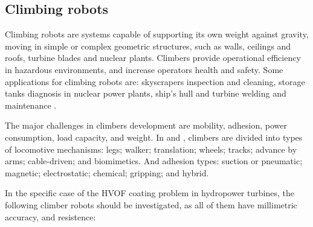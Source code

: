 \subsection{Climbing robots}\label{sota_climbers}
Climbing robots are systems capable of supporting its own weight against
gravity, moving in simple or complex geometric structures, such as
walls, ceilings and roofs, turbine blades and nuclear plants.
Climbers provide operational efficiency in hazardous environments, and increase
operators health and safety. Some applications for climbing robots are:
skyscrapers inspection and cleaning, storage tanks diagnosis in nuclear
power plants, ship's hull and turbine welding and
maintenance \citep{armada2003application}.

The major challenges in climbers development are mobility, adhesion,
power consumption, load capacity, and weight. In \cite{modular} and \cite{climbsurv},
climbers are divided into types of locomotive mechanisms: legs; walker; translation; wheels; tracks;
advance by arms; cable-driven; and biomimetics. And adhesion types:
suction or pneumatic; magnetic; electrostatic; chemical; gripping; and hybrid.

In the specific case of the HVOF coating problem in hydropower turbines, the
following climber robots should be investigated, as all of them have millimetric
accuracy, and resistence:

